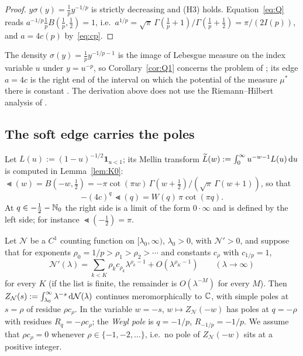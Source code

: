 \begin{proof}
$y\sigma(y)=\frac1py^{-1/p}$ is strictly decreasing and (H3) holds. Equation~\eqref{eq:Q} reads
$a^{-1/p}\frac1pB(\frac1p,\frac12)=1$, i.e.\ $a^{1/p}=\sqrt\pi\,\Gamma(\frac1p+1)/\Gamma(\frac1p+\frac12)=\pi/(2I(p))$, and
$a=4c(p)$ by~\eqref{eq:cp}.
\end{proof}

The density $\sigma(y)=\frac1py^{-1/p-1}$ is the image of Lebesgue measure on the index variable $u$ under
$y=u^{-p}$, so Corollary~\ref{cor:Q1} concerns the problem of \cite[Theorem~1.3]{PaperI}; its edge $a=4c$ is the
right end of the interval on which the potential of the measure $\mu^*$ there is constant
\cite[Theorem~1.3(ii)]{PaperI}. The derivation above does not use the Riemann--Hilbert analysis of \cite{PaperII}.

\subsection{The soft edge carries the poles}\label{sec:M12}
Let $L(u):=(1-u)^{-1/2}\mathbf 1_{u<1}$; its Mellin transform $\widetilde L(w):=\int_0^\infty u^{-w-1}L(u)\,\mathrm{d} u$ is computed in
Lemma~\ref{lem:K0}: $\Lt(w)=B(-w,\frac12)=-\pi\cot(\pi w)\,\Gamma(w+\frac12)/(\sqrt\pi\,\Gamma(w+1))$, so that
\begin{equation}\label{eq:Lt-W}
  -(4c)^q\,\Lt(q)=W(q)\,\pi\cot(\pi q).
\end{equation}
At $q\in-\frac12-\mathbb{N}_0$ the right side is a limit of the form $0\cdot\infty$ and is defined by the left side; for
instance $\Lt(-\frac12)=\pi$.

Let $\mathcal N$ be a $C^1$ counting function on $[\lambda_0,\infty)$, $\lambda_0>0$, with $\mathcal N'>0$, and suppose
that for exponents $\rho_0=1/p>\rho_1>\rho_2>\dotsb$ and constants $c_\rho$ with $c_{1/p}=1$,
\begin{equation}\label{eq:Nexp}
  \mathcal N'(\lambda)=\sum_{k<K}\rho_kc_{\rho_k}\lambda^{\rho_k-1}+O(\lambda^{\rho_K-1})\qquad(\lambda\to\infty)
\end{equation}
for every $K$ (if the list is finite, the remainder is $O(\lambda^{-M})$ for every $M$). Then
$Z_{\mathcal N}(s):=\int_{\lambda_0}^\infty\lambda^{-s}\,\mathrm{d}\mathcal N(\lambda)$ continues meromorphically to $\mathbb{C}$, with
simple poles at $s=\rho$ of residue $\rho c_\rho$. In the variable $w=-s$, $w\mapsto Z_{\mathcal N}(-w)$ has poles at
$q=-\rho$ with residues $R_q=-\rho c_\rho$; the \emph{Weyl pole} is $q=-1/p$, $R_{-1/p}=-1/p$. We assume that
$\rho c_\rho=0$ whenever $\rho\in\{-1,-2,\dots\}$, i.e.\ no pole of $Z_{\mathcal N}(-w)$ sits at a positive integer.

